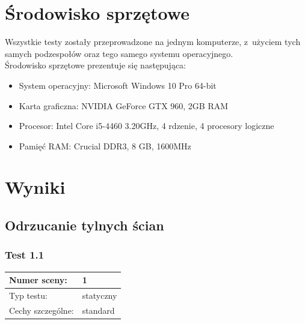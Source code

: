 \documentclass[a4paper,twoside,12pt]{book}
\begin{document}
\section{Środowisko sprzętowe}
Wszystkie testy zostały przeprowadzone na jednym komputerze, z~użyciem tych samych podzespołów oraz tego samego systemu operacyjnego. \\
Środowisko sprzętowe prezentuje się następująca:
\begin{itemize}
    \item System operacyjny: Microsoft Windows 10 Pro 64-bit
    \item Karta graficzna: NVIDIA GeForce GTX 960, 2GB RAM
    \item Procesor: Intel Core i5-4460 3.20GHz, 4 rdzenie, 4 procesory logiczne
    \item Pamięć RAM: Crucial DDR3, 8 GB, 1600MHz
\end{itemize}

\newpage

\section{Wyniki}
\label{section:wyniki}

\subsection{Odrzucanie tylnych ścian}

\subsubsection{Test 1.1}
\begin{tabular}{|l||l|}
\hline
Numer sceny: & 1 \\
\hline
Typ testu: & statyczny \\
\hline
Cechy szczególne: & standard \\
\hline
\end{tabular}\\

\vbox{}
\end{document}
